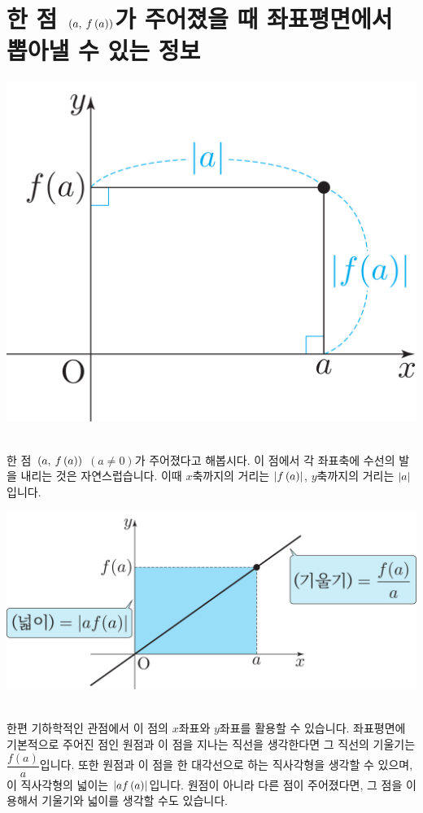 \section{한 점 $\mathrm{}\left(a,\:f\left( a \right) \right)$가 주어졌을 때  좌표평면에서 뽑아낼 수 있는 정보}
\begin{center} \includegraphics[scale=\pgfkeysvalueof{picsize}]{DBs/pic/zery_15.pdf}\
	\end{center}한 점 $\mathrm{}\left(a,\:f\left( a \right) \right)$ $(a \ne 0)$가 주어졌다고 해봅시다. 이 점에서 각 좌표축에 수선의 발을 내리는 것은 자연스럽습니다. 이때 $x$축까지의 거리는 $\left|f\left( a \right) \right|$, $y$축까지의 거리는 $\left|a\right|$입니다.
\begin{center} \includegraphics[scale=\pgfkeysvalueof{picsize}]{DBs/pic/zery_16.pdf}\
	\end{center}한편 기하학적인 관점에서 이 점의 $x$좌표와 $y$좌표를 활용할 수 있습니다. 좌표평면에 기본적으로 주어진 점인 원점과 이 점을 지나는 직선을 생각한다면 그 직선의 기울기는 $\dfrac{f\left( a \right) }{a}$입니다. 또한 원점과 이 점을 한 대각선으로 하는 직사각형을 생각할 수 있으며, 이 직사각형의 넓이는 $\left|af\left( a \right) \right|$입니다. 원점이 아니라 다른 점이 주어졌다면, 그 점을 이용해서 기울기와 넓이를 생각할 수도 있습니다.
